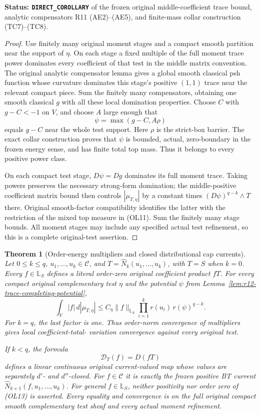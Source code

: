 \documentclass[11pt,a4paper]{article}
\numberwithin{equation}{section}
\newtheorem{theorem}{Theorem}[section]
\theoremstyle{definition}
\theoremstyle{remark}
\begin{document}
\noindent\textbf{Status: \texttt{DIRECT\_COROLLARY}} of
the frozen original middle-coefficient trace bound, analytic
compensators R11 \textup{(AE2)--(AE5)}, and finite-mass
collar construction \textup{(TC7)--(TC8)}.

\begin{proof}
Use finitely many original moment stages and a compact
smooth partition near the support of $\eta$.  On each
stage a fixed multiple of the full moment trace power
dominates every coefficient of that test in the middle
matrix convention.  The original analytic compensator
lemma gives a global smooth classical psh function whose
curvature dominates this stage's positive $(1,1)$ trace
near the relevant compact piece.  Sum the finitely many
compensators, obtaining one smooth classical $g$ with
all these local domination properties.  Choose $C$ with
$g-C<-1$ on $V$, and choose $A$ large enough that
\[
                         \psi=\max(g-C,A\rho)
\]
equals $g-C$ near the whole test support.  Here $\rho$
is the strict-box barrier.  The exact collar construction
proves that $\psi$ is bounded, actual, zero-boundary in
the frozen energy sense, and has finite total top mass.
Thus it belongs to every positive power class.

On each compact test stage, $D\psi=Dg$ dominates its
full moment trace.  Taking powers preserves the necessary
strong-form domination; the middle-positive coefficient
matrix bound then controls $|\mu_{T,\eta}|$ by a
constant times $(D\psi)^{q-k}\wedge T$ there.
Original smooth-factor compatibility identifies the latter
with the restriction of the mixed top measure in
\textup{(OL11)}.  Sum the finitely many stage bounds.
All moment stages may include any specified actual test
refinement, so this is a complete original-test assertion.
\end{proof}

\begin{theorem}[Order-energy multipliers and closed distributional cap currents]
\label{thm:r12-lattice-current-multipliers}
Let $0\le k\le q$, $u_1,\ldots,u_k\in\mathscr C$, and
$T=\widehat N_k(u_1,\ldots,u_k)$, with $T=S$ when $k=0$.
Every $f\in\mathbb L_S$ defines a literal order-zero
original coefficient product $fT$.  For every compact
original complementary test $\eta$ and the potential
$\psi$ from Lemma~\ref{lem:r12-trace-completing-potential},
\[
 \int_V|f|\,d|\mu_{T,\eta}|
       \le C_\eta\|f\|_{\mathbb L_S}
                   \prod_{i=1}^k r(u_i)\,r(\psi)^{q-k}.
 \tag{OL12}
\]
For $k=q$, the last factor is one.  Thus order-norm
convergence of multipliers gives local coefficient-total-
variation convergence against every original test.

If $k<q$, the formula
\[
                 \mathcal D_T(f)=D(fT)
 \tag{OL13}
\]
defines a linear continuous original current-valued map
whose values are separately $d'$- and $d''$-closed.
For $f\in\mathscr C$ it is exactly the frozen positive
BT current
$\widehat N_{k+1}(f,u_1,\ldots,u_k)$.
For general $f\in\mathbb L_S$, neither positivity nor
order zero of \textup{(OL13)} is asserted.
Every equality and convergence is on the full original
compact smooth complementary test sheaf and every actual
moment refinement.
\end{theorem}
\end{document}
